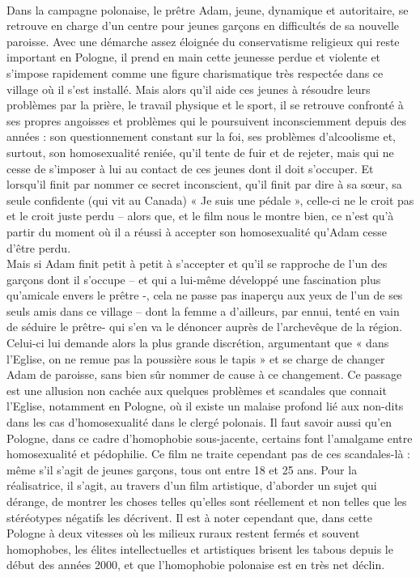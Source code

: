 \documentclass[12pt, twocolumn]{amsart}
\begin{document}
\paragraph{}
Dans la campagne polonaise, le prêtre Adam, jeune, dynamique et autoritaire, se retrouve en charge d’un centre pour jeunes garçons en difficultés de sa nouvelle paroisse. Avec une démarche assez éloignée du conservatisme religieux qui reste important en Pologne, il prend en main cette jeunesse perdue et violente et s’impose rapidement comme une figure charismatique très respectée dans ce village où il s’est installé. Mais alors qu’il aide ces jeunes à résoudre leurs problèmes par la prière, le travail physique et le sport, il se retrouve confronté à ses propres angoisses et problèmes qui le poursuivent inconsciemment depuis des années : son questionnement constant sur la foi, ses problèmes d’alcoolisme et, surtout, son homosexualité reniée, qu’il tente de fuir et de rejeter, mais qui ne cesse de s’imposer à lui au contact de ces jeunes dont il doit s’occuper. Et lorsqu’il finit par nommer ce secret inconscient, qu’il finit par dire à sa sœur, sa seule confidente (qui vit au Canada) « Je suis une pédale », celle-ci ne le croit pas et le croit juste perdu – alors que, et le film nous le montre bien, ce n’est qu’à partir du moment où il a réussi à accepter son homosexualité qu’Adam cesse d’être perdu.\\
 Mais si Adam finit petit à petit à s’accepter et qu’il se rapproche de l’un des garçons dont il s’occupe – et qui a lui-même développé une fascination plus qu’amicale envers le prêtre -, cela ne passe pas inaperçu aux yeux de l’un de ses seuls amis dans ce village – dont la femme a d’ailleurs, par ennui, tenté en vain de séduire le prêtre- qui s’en va le dénoncer auprès de l’archevêque de la région. Celui-ci lui demande alors la plus grande discrétion, argumentant que « dans l’Eglise, on ne remue pas la poussière sous le tapis » et se charge de changer Adam de paroisse, sans bien sûr nommer de cause à ce changement. Ce passage est une allusion non cachée aux quelques problèmes et scandales que connait l’Eglise, notamment en Pologne, où il existe un malaise profond lié aux non-dits dans les cas d'homosexualité dans le clergé polonais. Il faut savoir aussi qu’en Pologne, dans ce cadre d’homophobie sous-jacente, certains font l’amalgame entre homosexualité et pédophilie. Ce film ne traite cependant pas de ces scandales-là : même s’il s’agit de jeunes garçons, tous ont entre 18 et 25 ans. Pour la réalisatrice, il s’agit, au travers d’un film artistique, d’aborder un sujet qui dérange, de montrer les choses telles qu’elles sont réellement et non telles que les stéréotypes négatifs les décrivent. Il est à noter cependant que, dans cette Pologne à deux vitesses où les milieux ruraux restent fermés et souvent homophobes, les élites intellectuelles et artistiques brisent les tabous depuis le début des années 2000, et que l'homophobie polonaise est en très net déclin.
\end{document}
